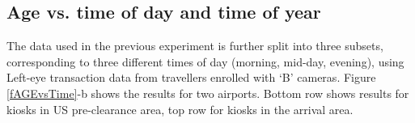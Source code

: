 \documentclass{cta-author}%
\begin{document}





\subsection{Age vs. time of day and time of year}



The data used  in the previous experiment is further split into three subsets, corresponding to three different times of day (morning, mid-day, evening), using Left-eye transaction data from travellers enrolled with  `B' cameras.
Figure \ref{fAGEvsTime}-b shows the results for two airports.  
Bottom row shows results for kiosks in US pre-clearance area, top row for kiosks in the arrival area.





\end{document}
